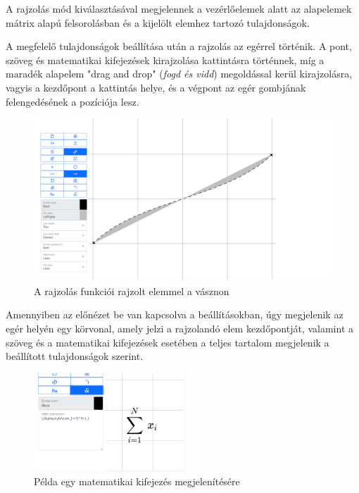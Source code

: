 A rajzolás mód kiválasztásával megjelennek a vezérlőelemek alatt az alapelemek mátrix alapú felsorolásban és a kijelölt elemhez tartozó tulajdonságok.

A megfelelő tulajdonságok beállítása után a rajzolás az egérrel történik. A pont, szöveg és matematikai kifejezések kirajzolása kattintásra történnek, míg a maradék alapelem "drag and drop" (\textit{fogd és vidd}) megoldással kerül kirajzolásra, vagyis a kezdőpont a kattintás helye, és a végpont az egér gombjának felengedésének a pozíciója lesz.

\begin{figure}[!h]
	\label{fig:draw}
	\centering
	\includegraphics[width=\textwidth]{images/editor_draw.png}
	\caption{A rajzolás funkciói rajzolt elemmel a vásznon}
\end{figure}

Amennyiben az előnézet be van kapcsolva a beállításokban, úgy megjelenik az egér helyén egy körvonal, amely jelzi a rajzolandó elem kezdőpontját, valamint a szöveg és a matematikai kifejezések esetében a teljes tartalom megjelenik a beállított tulajdonságok szerint.



\begin{figure}[!h]
	\label{fig:math}
	\centering
	\includegraphics[width=0.5\textwidth]{images/math.png}
	\caption{Példa egy matematikai kifejezés megjelenítésére}
\end{figure}

